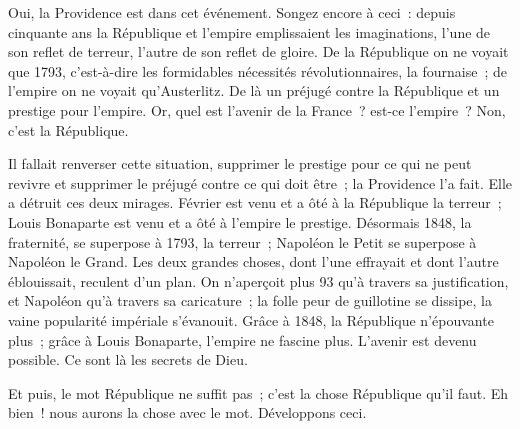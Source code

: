 \documentclass[french,twoside]{book} %
\begin{document}
Oui, la Providence est dans cet événement. Songez encore à ceci : depuis cinquante ans la République et l’empire emplissaient les imaginations, l’une de son reflet de terreur, l’autre de son reflet de gloire. De la République on ne voyait que 1793, c’est-à-dire les formidables nécessités révolutionnaires, la fournaise ; de l’empire on ne voyait qu’Austerlitz. De là un préjugé contre la République et un prestige pour l’empire. Or, quel est l’avenir de la France ? est-ce l’empire ? Non, c’est la République.\par
Il fallait renverser cette situation, supprimer le prestige pour ce qui ne peut revivre et supprimer le préjugé contre ce qui doit être ; la Providence l’a fait. Elle a détruit ces deux mirages. Février est venu et a ôté à la République la terreur ; Louis Bonaparte est venu et a ôté à l’empire le prestige. Désormais 1848, la fraternité, se superpose à 1793, la terreur ; Napoléon le Petit se superpose à Napoléon le Grand. Les deux grandes choses, dont l’une effrayait et dont l’autre éblouissait, reculent d’un plan. On n’aperçoit plus 93 qu’à travers sa justification, et Napoléon qu’à travers sa caricature ; la folle peur de guillotine se dissipe, la vaine popularité impériale s’évanouit. Grâce à 1848, la République n’épouvante plus ; grâce à Louis Bonaparte, l’empire ne fascine plus. L’avenir est devenu possible. Ce sont là les secrets de Dieu.\par
Et puis, le mot République ne suffit pas ; c’est la chose République qu’il faut. Eh bien ! nous aurons la chose avec le mot. Développons ceci.
\end{document}
